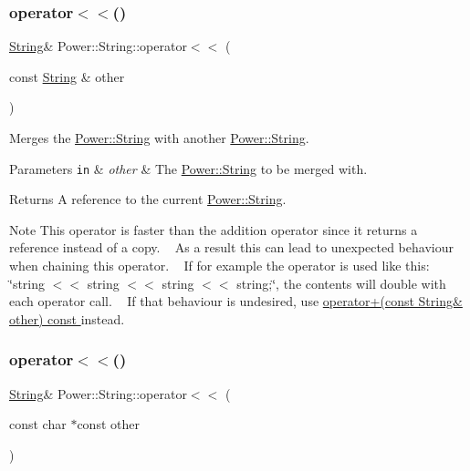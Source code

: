 \subsubsection{\texorpdfstring{operator$<$$<$()}{operator<<()}\hspace{0.1cm}{\footnotesize\ttfamily [1/3]}}
{\footnotesize\ttfamily \hyperlink{class_power_1_1_string}{String}\& Power\+::\+String\+::operator$<$$<$ (\begin{DoxyParamCaption}\item[{const \hyperlink{class_power_1_1_string}{String} \&}]{other }\end{DoxyParamCaption})\hspace{0.3cm}{\ttfamily [inline]}}



Merges the \hyperlink{class_power_1_1_string}{Power\+::\+String} with another \hyperlink{class_power_1_1_string}{Power\+::\+String}. 


\begin{DoxyParams}[1]{Parameters}
\mbox{\tt in}  & {\em other} & The \hyperlink{class_power_1_1_string}{Power\+::\+String} to be merged with. \\
\hline
\end{DoxyParams}
\begin{DoxyReturn}{Returns}
A reference to the current \hyperlink{class_power_1_1_string}{Power\+::\+String}. 
\end{DoxyReturn}
\begin{DoxyNote}{Note}
This operator is faster than the addition operator since it returns a reference instead of a copy. ~\newline
 As a result this can lead to unexpected behaviour when chaining this operator. ~\newline
 If for example the operator is used like this\+: \char`\"{}string $<$$<$ string $<$$<$ string $<$$<$ string;\char`\"{}, the contents will double with each operator call. ~\newline
 If that behaviour is undesired, use \hyperlink{class_power_1_1_string_a570430069e83e0421ccdfb3cddc8a899}{operator+(const String\& other) const }instead. 
\end{DoxyNote}
\mbox{\label{class_power_1_1_string_a736113857946d87afa440b5f7c758087}} 
\subsubsection{\texorpdfstring{operator$<$$<$()}{operator<<()}\hspace{0.1cm}{\footnotesize\ttfamily [2/3]}}
{\footnotesize\ttfamily \hyperlink{class_power_1_1_string}{String}\& Power\+::\+String\+::operator$<$$<$ (\begin{DoxyParamCaption}\item[{const char $\ast$const}]{other }\end{DoxyParamCaption})\hspace{0.3cm}{\ttfamily [inline]}}



